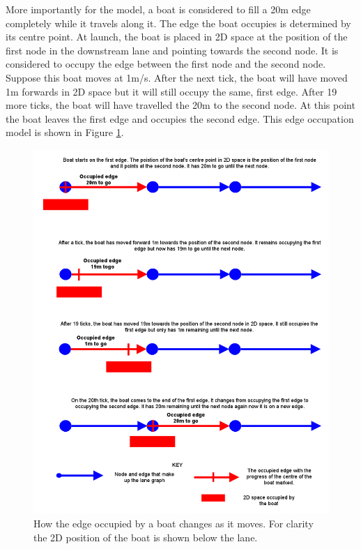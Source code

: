       More importantly for the model, a boat is considered to fill a 20m edge completely while it travels along it. The edge the boat occupies is determined by its centre point. At launch, the boat is placed in 2D space at the position of the first node in the downstream lane and pointing towards the second node. It is considered to occupy the edge between the first node and the second node. Suppose this boat moves at 1m/s. After the next tick, the boat will have moved 1m forwards in 2D space but it will still occupy the same, first edge. After 19 more ticks, the boat will have travelled the 20m to the second node. At this point the boat leaves the first edge and occupies the second edge. This edge occupation model is shown in Figure \ref{fig:model:edgeoccupation}.
      
      \begin{figure}
      \begin{center}
      	\includegraphics[scale=0.45]{images/edgeoccupation.png}
      	\caption{How the edge occupied by a boat changes as it moves. For clarity the 2D position of the boat is shown below the lane.}
      	\label{fig:model:edgeoccupation}
      \end{center}
      \end{figure}
      
